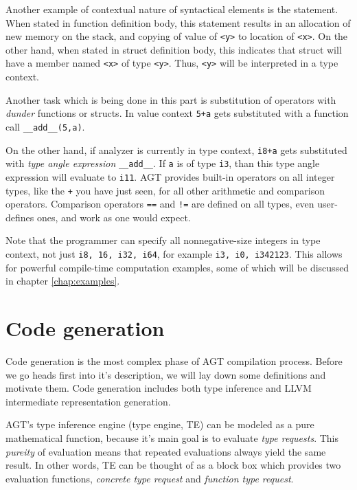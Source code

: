 \documentclass[times, utf8, diplomski]{fer}
\theoremstyle{definition}
\newcommand{\pythoncode}[3]{
    
}
\begin{document}
\pythoncode{\resdir/compiler/initex.py}{semana}{a}

Another example of contextual nature of syntactical elements is the  statement.
When stated in function definition body, this statement results in an allocation 
of new memory on the stack,
and copying of value of \texttt{<y>} to location of \texttt{<x>}.
On the other hand, when stated in struct definition body, this indicates that
struct will have a member named \texttt{<x>} of type \texttt{<y>}. 
Thus, \texttt{<y>} will be interpreted in a type context.

Another task which is being done in this part is substitution of operators with 
\textit{dunder} functions or structs. In value context \texttt{5+a} gets
substituted with a function call \texttt{\_\_add\_\_(5,a)}. 

On the other hand,
if analyzer is currently in type context, \texttt{i8+a} gets substituted with
\textit{type angle expression} \texttt{\_\_add\_\_<i8, a>}. If \texttt{a} is of type \texttt{i3},
than this type angle expression will evaluate to \texttt{i11}. AGT provides built-in operators
on all integer types, like the \texttt{+} you have just seen, for all other arithmetic and
comparison operators. Comparison operators \texttt{==} and \texttt{!=} are defined on all types, 
even user-defines ones, and work as one would expect.

Note that the programmer can specify all nonnegative-size 
integers in type context, not just \texttt{i8, 16, i32, i64},
for example \texttt{i3, i0, i342123}.
This allows for powerful compile-time computation examples, 
some of which will be discussed in chapter \ref{chap:examples}.


\section{Code generation}\label{sect:codegen}

Code generation is the most complex phase of AGT compilation process.
Before we go heads first into it's description, we will lay down some definitions
and motivate them. Code generation includes both type inference and LLVM intermediate representation
generation. 

AGT's type inference engine (type engine, TE) can be modeled as a 
pure mathematical function, because it's main goal is to evaluate \textit{type requests}.
This \textit{pureity} of evaluation means that repeated evaluations always yield the same result.
In other words, TE can be thought of as a block box which provides two evaluation functions,
\textit{concrete type request} and \textit{function type request}.
\end{document}

